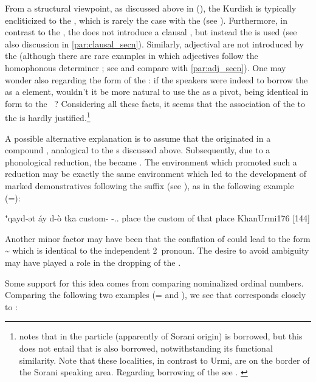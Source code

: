 {\newpage 
From a structural viewpoint, as discussed above in (), the Kurdish \ez* is typically encliticized to the \prim, which is rarely the case with the \lnk* {} (see ). Furthermore, in contrast to the \ez*, the  \lnk* does not introduce a clausal \secn, but instead the \rel* {} is used (see also discussion in \vref{par:clausal_secn}). Similarly, adjectival \secns are not introduced by the \lnk* {} (although there are rare examples in which adjectives follow the homophonous determiner ; see  and compare with \vref{par:adj_secn}). One may wonder also regarding the form of the \JUrm \lnk*: if the \JUrm speakers were indeed to borrow the \ez* as a \dem* element, wouldn't it be more natural to use the \JUrm \dem* {} as a pivot, being identical in form to the \Kur \fem\ \ez*?  Considering all these facts, it seems that the association of the  \lnk* to the  \ez* is hardly justified.\footnote{\citet[171, \S 2.32.12]{Garbell1965impact} notes that in \Sol the \ez* particle  (apparently of Sorani origin) is borrowed, but this does not entail that  is also borrowed, notwithstanding its functional similarity. Note that these localities, in contrast to Urmi, are on the border of the Sorani speaking area. Regarding borrowing of the  \ez* see . \label{fn:Solduz_lnk}}

A possible alternative explanation is to assume that the \lnk* {} originated  in a compound \lnk* {}, analogical to the \lnk*s discussed above. Subsequently, due to a phonological reduction, the \lnk* became . The environment which promoted such a reduction may be exactly the same environment which led to the development of \gen* marked demonstratives following the \ed suffix (see ), as in the following example (=):

{⁺qayd-ət áy d-ò\cb{} tka}
{custom-\cst{} \lnk{} \gen-\dem.\far.\sg\cb{} place}
{the custom of that place}
{KhanUrmi}{176 {[144]}}

Another minor factor may have been that the conflation of  could lead to the form \~ which is identical to the independent 2\sg\ pronoun. The desire to avoid ambiguity  may have played a role in the dropping of the .

Some support for this idea comes from comparing nominalized ordinal numbers. Comparing the following two examples (= and ), we see that \JZax {} corresponds closely to \JUrm {}:

}
